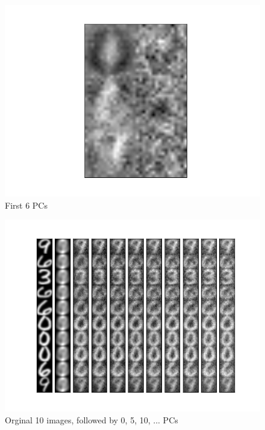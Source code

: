\documentclass[a4paper,11pt]{article}
\begin{document}
\begin{figure}[H]
  \includegraphics[width=\linewidth]{5_b_c_30.png}
  \caption{First 6 PCs}\label{fig:awesome_image3}
\endminipage
\end{figure}

\begin{figure}[H]
  \includegraphics[width=\linewidth]{5_c_Xprime_30_45_allinone.png}
  \caption{Orginal 10 images, followed by 0, 5, 10, ... PCs}\label{fig:6}
\end{figure}
\end{document}
